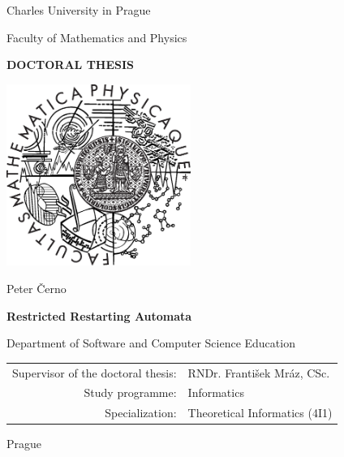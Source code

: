 \documentclass[12pt,a4paper,twoside,openright,natbib]{book}
\begin{document}


\pagestyle{empty}
\begin{center}

\large

Charles University in Prague

\medskip

Faculty of Mathematics and Physics

\vfill

{\bf\Large DOCTORAL THESIS}

\vfill

\centerline{\mbox{\includegraphics[width=60mm]{img/logo.eps}}}

\vfill
\vspace{5mm}

{\LARGE Peter Černo}

\vspace{15mm}

{\LARGE\bfseries Restricted Restarting Automata}

\vfill

Department of Software and Computer Science Education

\vfill

\begin{tabular}{rl}

Supervisor of the doctoral thesis: & RNDr. František Mráz, CSc. \\
\noalign{\vspace{2mm}}
Study programme: & Informatics \\
\noalign{\vspace{2mm}}
Specialization: & Theoretical Informatics (4I1) \\
\end{tabular}

\vfill

Prague \the\year

\end{center}
\end{document}
